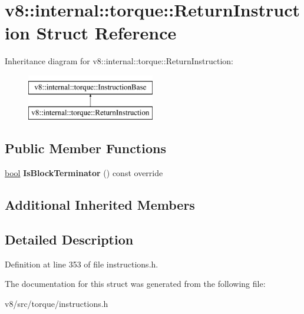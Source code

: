 \hypertarget{structv8_1_1internal_1_1torque_1_1ReturnInstruction}{}\section{v8\+:\+:internal\+:\+:torque\+:\+:Return\+Instruction Struct Reference}
\label{structv8_1_1internal_1_1torque_1_1ReturnInstruction}
Inheritance diagram for v8\+:\+:internal\+:\+:torque\+:\+:Return\+Instruction\+:\begin{figure}[H]
\begin{center}
\leavevmode
\includegraphics[height=2.000000cm]{structv8_1_1internal_1_1torque_1_1ReturnInstruction}
\end{center}
\end{figure}
\subsection*{Public Member Functions}
\begin{DoxyCompactItemize}
\item 
\mbox{\label{structv8_1_1internal_1_1torque_1_1ReturnInstruction_ac1a48291c604435c110c3ac612a74033}} 
\mbox{\hyperlink{classbool}{bool}} {\bfseries Is\+Block\+Terminator} () const override
\end{DoxyCompactItemize}
\subsection*{Additional Inherited Members}


\subsection{Detailed Description}


Definition at line 353 of file instructions.\+h.



The documentation for this struct was generated from the following file\+:\begin{DoxyCompactItemize}
\item 
v8/src/torque/instructions.\+h\end{DoxyCompactItemize}
